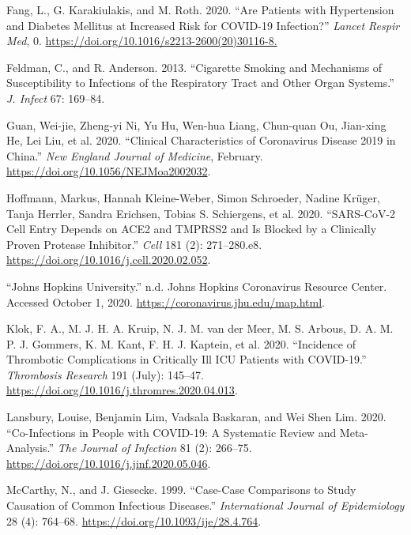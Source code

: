 \documentclass[
]{article}
\begin{document}
\leavevmode\hypertarget{ref-Fang_2020}{}%
Fang, L., G. Karakiulakis, and M. Roth. 2020. ``Are Patients with
Hypertension and Diabetes Mellitus at Increased Risk for COVID-19
Infection?'' \emph{Lancet Respir Med}, 0.
\url{https://doi.org/10.1016/s2213-2600(20)30116-8.}

\leavevmode\hypertarget{ref-Feldman_2013}{}%
Feldman, C., and R. Anderson. 2013. ``Cigarette Smoking and Mechanisms
of Susceptibility to Infections of the Respiratory Tract and Other Organ
Systems.'' \emph{J. Infect} 67: 169--84.

\leavevmode\hypertarget{ref-Guan_2020}{}%
Guan, Wei-jie, Zheng-yi Ni, Yu Hu, Wen-hua Liang, Chun-quan Ou,
Jian-xing He, Lei Liu, et al. 2020. ``Clinical Characteristics of
Coronavirus Disease 2019 in China.'' \emph{New England Journal of
Medicine}, February. \url{https://doi.org/10.1056/NEJMoa2002032}.

\leavevmode\hypertarget{ref-Hoffman_2020}{}%
Hoffmann, Markus, Hannah Kleine-Weber, Simon Schroeder, Nadine Krüger,
Tanja Herrler, Sandra Erichsen, Tobias S. Schiergens, et al. 2020.
``SARS-CoV-2 Cell Entry Depends on ACE2 and TMPRSS2 and Is Blocked by a
Clinically Proven Protease Inhibitor.'' \emph{Cell} 181 (2):
271--280.e8. \url{https://doi.org/10.1016/j.cell.2020.02.052}.

\leavevmode\hypertarget{ref-COVID_JH_2020}{}%
``Johns Hopkins University.'' n.d. Johns Hopkins Coronavirus Resource
Center. Accessed October 1, 2020.
\url{https://coronavirus.jhu.edu/map.html}.

\leavevmode\hypertarget{ref-Klok_2020}{}%
Klok, F. A., M. J. H. A. Kruip, N. J. M. van der Meer, M. S. Arbous, D.
A. M. P. J. Gommers, K. M. Kant, F. H. J. Kaptein, et al. 2020.
``Incidence of Thrombotic Complications in Critically Ill ICU Patients
with COVID-19.'' \emph{Thrombosis Research} 191 (July): 145--47.
\url{https://doi.org/10.1016/j.thromres.2020.04.013}.

\leavevmode\hypertarget{ref-Lansbury_2020}{}%
Lansbury, Louise, Benjamin Lim, Vadsala Baskaran, and Wei Shen Lim.
2020. ``Co-Infections in People with COVID-19: A Systematic Review and
Meta-Analysis.'' \emph{The Journal of Infection} 81 (2): 266--75.
\url{https://doi.org/10.1016/j.jinf.2020.05.046}.

\leavevmode\hypertarget{ref-Mccarthy_1999}{}%
McCarthy, N., and J. Giesecke. 1999. ``Case-Case Comparisons to Study
Causation of Common Infectious Diseases.'' \emph{International Journal
of Epidemiology} 28 (4): 764--68.
\url{https://doi.org/10.1093/ije/28.4.764}.
\end{document}

